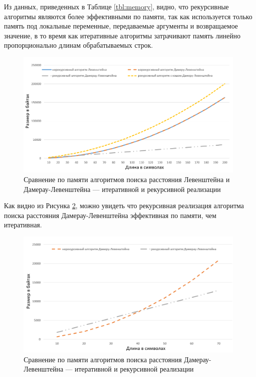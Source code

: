 \clearpage

Из данных, приведенных в Таблице \ref{tbl:memory}, видно, что рекурсивные алгоритмы являются более эффективными по памяти, так как используется только память под локальные переменные, передаваемые аргументы и возвращаемое значение, в то время как итеративные алгоритмы затрачивают память линейно пропорционально длинам обрабатываемых строк.

\begin{figure}[h]
	\centering
	\includegraphics[height=0.3\textheight]{img/diag_03.png}
	\caption{Сравнение по памяти алгоритмов поиска расстояния Левенштейна и Дамерау-Левенштейна --- итеративной и рекурсивной реализации}
	\label{plt:memory}
\end{figure}

\clearpage

Как видно из Рисунка \ref{plt:memory_1}, можно увидеть что рекурсивная реализация алгоритма поиска расстояния Дамерау-Левенштейна эффективная по памяти, чем итеративная.

\begin{figure}[h]
	\centering
	\includegraphics[height=0.3\textheight]{img/diag_04.png}
	\caption{Сравнение по памяти алгоритмов поиска расстояния Дамерау-Левенштейна --- итеративной и рекурсивной реализации}
	\label{plt:memory_1}
\end{figure}

